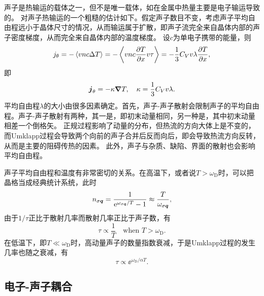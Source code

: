 声子是热输运的载体之一，但不是唯一载体，如在金属中热量主要是电子输运导致的。
对声子热输运的一个粗糙的估计如下。假定声子数目不变，考虑声子平均自由程远小于晶体尺寸的情况，从而输运属于扩散，即声子流完全来自晶体内部的声子密度梯度，从而完全来自晶体内部的温度梯度。
设$c$为单电子携带的能量，则
\[
    j_\theta = - \expval*{v n c \Delta T} = - \expval{v n c \pdv{T}{x} v \tau} = - \frac{1}{3} C_V v \lambda \pdv{T}{x},
\]
即
\begin{equation}
    \vb*{j}_\theta = -\kappa \grad{T}, \quad \kappa = \frac{1}{3} C_V v \lambda.
\end{equation}
平均自由程$\lambda$的大小由很多因素确定。首先，声子-声子散射会限制声子的平均自由程。声子-声子散射有两种，其一是，即初末动量相同，另一种是，其中初末动量相差一个倒格矢。
正规过程影响了动量的分布，但热流的方向大体上是不变的，而Umklapp过程会导致两个向前的声子合并后反而向后，即会导致热流方向反转，从而是主要的阻碍传热的因素。
此外，声子与杂质、缺陷、界面的散射也会影响平均自由程。

声子平均自由程和温度有非常密切的关系。在高温下，或者说$T > \omega_\text{D}$时，可以把晶格当成经典统计系统，此时
\begin{equation}
    n_{\sigma \vb*{q}} = \frac{1}{\mathrm{e}^{\omega_{\sigma \vb*{q}} / T} - 1} \approx \frac{T}{\omega_{\sigma \vb*{q}}},
\end{equation}
由于$1/ \tau$正比于散射几率而散射几率正比于声子数，有
\begin{equation}
    \tau \propto \frac{1}{T} \quad \text{when $T > \omega_\text{D}$}.
\end{equation}
在低温下，即$T \ll \omega_\text{D}$时，高动量声子的数量指数衰减，于是Umklapp过程的发生几率也随之衰减，有
\begin{equation}
    \tau \propto \ee^{\omega_\text{D} / \alpha T}.
\end{equation}

\subsection{电子-声子耦合}

